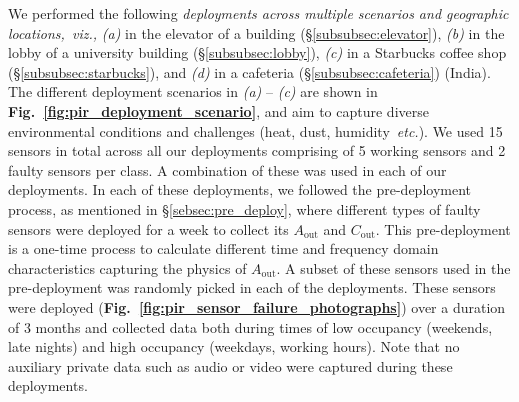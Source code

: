 \documentclass[manuscript]{acmart}
\newcommand{\viz}{{\it viz.,}\xspace}
\newcommand{\etc}{{\it etc.}}
\newcommand{\ca}{{\it (a) }}
\newcommand{\cb}{{\it (b) }}
\newcommand{\cc}{{\it (c) }}
\newcommand{\cd}{{\it (d) }}
\newcommand{\cout}{$C_{\text{out}}$\xspace}
\newcommand{\aout}{$A_{\text{out}}$\xspace}
\begin{document}
We performed the following \emph{deployments across multiple scenarios and geographic locations,~\viz}  
\ca in the elevator of a building (\S\ref{subsubsec:elevator}), 
\cb in the lobby of a university building (\S\ref{subsubsec:lobby}), \cc in a Starbucks coffee shop (\S\ref{subsubsec:starbucks}), and \cd in a cafeteria (\S\ref{subsubsec:cafeteria}) (India).
The different deployment scenarios in \ca -- \cc are shown in {\bfseries Fig.~\ref{fig:pir_deployment_scenario}}, and aim to capture diverse environmental conditions and challenges (heat, dust, humidity~\etc).
We used 15 sensors in total across all our deployments comprising of 5 working sensors and 2 faulty sensors per class. A combination of these was used in each of our deployments. In each of these deployments, we followed the pre-deployment process, as mentioned in \S\ref{sebsec:pre_deploy}, where different types of faulty sensors were deployed for a week to collect its \aout and \cout. This pre-deployment is a one-time process to calculate different time and frequency domain characteristics capturing the physics of \aout. A subset of these sensors used in the pre-deployment was randomly picked in each of the deployments.
These sensors were deployed (\textbf{Fig.~\ref{fig:pir_sensor_failure_photographs}}) over a duration of 3 months and collected data both during times of low occupancy (weekends, late nights) and high occupancy (weekdays, working hours). Note that no auxiliary private data such as audio or video were captured during these deployments. 
\end{document}
